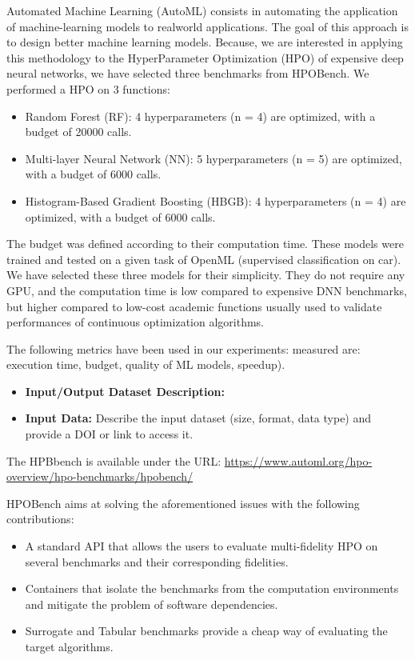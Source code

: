 Automated Machine Learning (AutoML) consists in automating
the application of machine-learning models to realworld
applications. The goal of this approach is to design
better machine learning models. Because, we are interested
in applying this methodology to the HyperParameter Optimization
(HPO) of expensive deep neural networks, we
have selected three benchmarks from HPOBench. We
performed a HPO on 3 functions:
\begin{itemize}
\item Random Forest (RF): 4 hyperparameters (n = 4) are
optimized, with a budget of 20000 calls.
\item Multi-layer Neural Network (NN): 5 hyperparameters
(n = 5) are optimized, with a budget of 6000 calls.
\item Histogram-Based Gradient Boosting (HBGB): 4 hyperparameters
(n = 4) are optimized, with a budget of 6000 calls.
\end{itemize}

The budget was defined according to their computation time. These models were trained and tested on a given task of OpenML (supervised classification on car). We have selected these three models for their simplicity. They do not require any GPU, and the computation time is low compared to expensive DNN benchmarks, but higher compared to low-cost academic functions usually used to
validate performances of continuous optimization algorithms.

The following metrics have been used in our experiments:  measured are: execution time, budget, quality of ML models, speedup).

\begin{itemize}
\item \textbf{Input/Output Dataset Description:}


\item \textbf{Input Data:} Describe the input dataset (size, format, data type) and provide a DOI or link to access it.
\end{itemize}

The HPBbench is available under the URL: \url{https://www.automl.org/hpo-overview/hpo-benchmarks/hpobench/}

HPOBench aims at solving the aforementioned issues with the following contributions:

\begin{itemize}
\item A standard API that allows the users to evaluate multi-fidelity HPO on several benchmarks and their corresponding fidelities.
\item Containers that isolate the benchmarks from the computation environments and mitigate the problem of software dependencies.
\item Surrogate and Tabular benchmarks provide a cheap way of evaluating the target algorithms.
\end{itemize}

